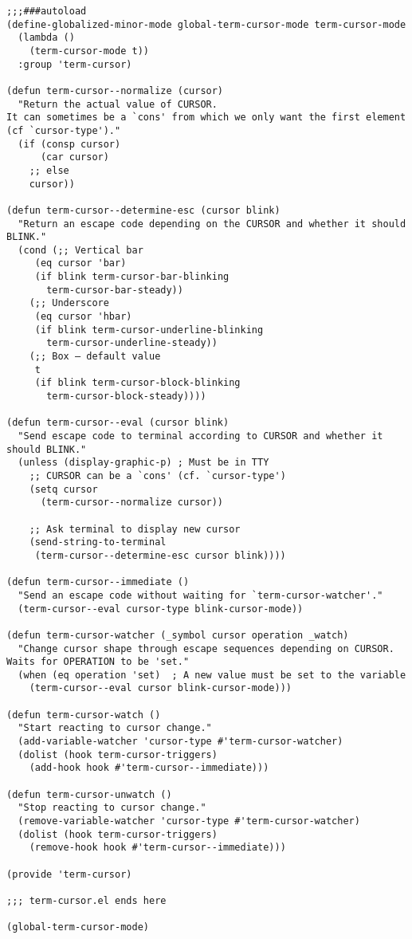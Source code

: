 \documentclass[8pt]{article}
\begin{document}
\begin{verbatim}
;;;###autoload
(define-globalized-minor-mode global-term-cursor-mode term-cursor-mode
  (lambda ()
    (term-cursor-mode t))
  :group 'term-cursor)

(defun term-cursor--normalize (cursor)
  "Return the actual value of CURSOR.
It can sometimes be a `cons' from which we only want the first element (cf `cursor-type')."
  (if (consp cursor)
      (car cursor)
    ;; else
    cursor))

(defun term-cursor--determine-esc (cursor blink)
  "Return an escape code depending on the CURSOR and whether it should BLINK."
  (cond (;; Vertical bar
	 (eq cursor 'bar)
	 (if blink term-cursor-bar-blinking
	   term-cursor-bar-steady))
	(;; Underscore
	 (eq cursor 'hbar)
	 (if blink term-cursor-underline-blinking
	   term-cursor-underline-steady))
	(;; Box — default value
	 t
	 (if blink term-cursor-block-blinking
	   term-cursor-block-steady))))

(defun term-cursor--eval (cursor blink)
  "Send escape code to terminal according to CURSOR and whether it should BLINK."
  (unless (display-graphic-p) ; Must be in TTY
    ;; CURSOR can be a `cons' (cf. `cursor-type')
    (setq cursor
	  (term-cursor--normalize cursor))

    ;; Ask terminal to display new cursor
    (send-string-to-terminal
     (term-cursor--determine-esc cursor blink))))

(defun term-cursor--immediate ()
  "Send an escape code without waiting for `term-cursor-watcher'."
  (term-cursor--eval cursor-type blink-cursor-mode))

(defun term-cursor-watcher (_symbol cursor operation _watch)
  "Change cursor shape through escape sequences depending on CURSOR.
Waits for OPERATION to be 'set."
  (when (eq operation 'set)  ; A new value must be set to the variable
    (term-cursor--eval cursor blink-cursor-mode)))

(defun term-cursor-watch ()
  "Start reacting to cursor change."
  (add-variable-watcher 'cursor-type #'term-cursor-watcher)
  (dolist (hook term-cursor-triggers)
    (add-hook hook #'term-cursor--immediate)))

(defun term-cursor-unwatch ()
  "Stop reacting to cursor change."
  (remove-variable-watcher 'cursor-type #'term-cursor-watcher)
  (dolist (hook term-cursor-triggers)
    (remove-hook hook #'term-cursor--immediate)))

(provide 'term-cursor)

;;; term-cursor.el ends here

(global-term-cursor-mode)
\end{verbatim}
\end{document}
